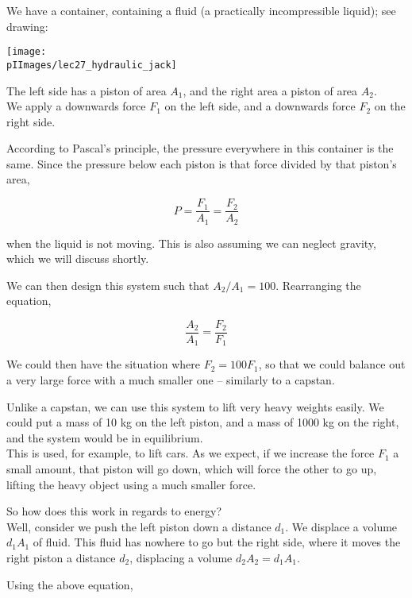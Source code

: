 We have a container, containing a fluid (a practically incompressible liquid); see drawing:

\begin{center}
\texttt{[image: \\pIImages/lec27\_hydraulic\_jack]}
\end{center}

The left side has a piston of area $A_1$, and the right area a piston of area $A_2$.\\
We apply a downwards force $F_1$ on the left side, and a downwards force $F_2$ on the right side.

According to Pascal's principle, the pressure everywhere in this container is the same. Since the pressure below each piston is that force divided by that piston's area,

\begin{equation}
P = \frac{F_1}{A_1} = \frac{F_2}{A_2}
\end{equation}

when the liquid is not moving. This is also assuming we can neglect gravity, which we will discuss shortly.

We can then design this system such that $A_2/A_1 = 100$. Rearranging the equation,

\begin{equation}
\frac{A_2}{A_1} = \frac{F_2}{F_1}
\end{equation}

We could then have the situation where $F_2 = 100 F_1$, so that we could balance out a very large force with a much smaller one -- similarly to a capstan.

Unlike a capstan, we can use this system to lift very heavy weights easily. We could put a mass of 10 kg on the left piston, and a mass of 1000 kg on the right, and the system would be in equilibrium.\\
This is used, for example, to lift cars. As we expect, if we increase the force $F_1$ a small amount, that piston will go down, which will force the other to go up, lifting the heavy object using a much smaller force.

So how does this work in regards to energy?\\
Well, consider we push the left piston down a distance $d_1$. We displace a volume $d_1 A_1$ of fluid. This fluid has nowhere to go but the right side, where it moves the right piston a distance $d_2$, displacing a volume $d_2 A_2 = d_1 A_1$.

Using the above equation,

